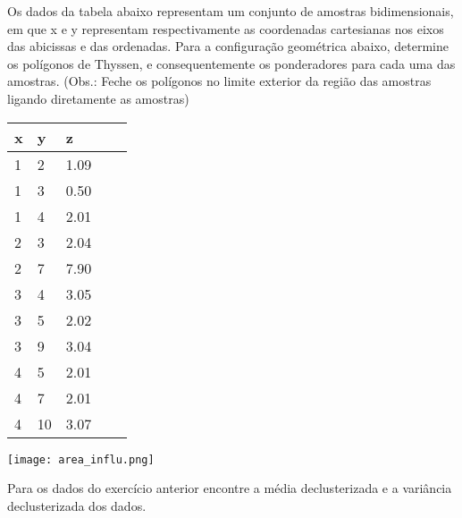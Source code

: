 \begin{exercise}
	Os dados da tabela abaixo representam um conjunto de amostras bidimensionais, em que x e y representam respectivamente as coordenadas cartesianas nos eixos das abicissas e das ordenadas. Para a configuração geométrica abaixo, determine os polígonos de Thyssen, e consequentemente os ponderadores para cada uma das amostras. (Obs.: Feche os polígonos no limite exterior da região das amostras ligando diretamente as amostras) 
	
	\centering
	\begin{tabular}{lllll}
		\hline
		x & y  & z    &  &  \\ \hline
		1 & 2  & 1.09 &  &  \\
		1 & 3  & 0.50 &  &  \\
		1 & 4  & 2.01 &  &  \\
		2 & 3  & 2.04 &  &  \\
		2 & 7  & 7.90 &  &  \\
		3 & 4  & 3.05 &  &  \\
		3 & 5  & 2.02 &  &  \\
		3 & 9  & 3.04 &  &  \\
		4 & 5  & 2.01 &  &  \\
		4 & 7  & 2.01 &  &  \\
		4 & 10 & 3.07 &  &  \\ \hline
	\end{tabular}


\vspace{50px}
\centering
\texttt{[image: area\_influ.png]}	

\end{exercise} 

\begin{exercise}
	Para os dados do exercício anterior encontre a média declusterizada e a variância declusterizada dos dados. 
\end{exercise}